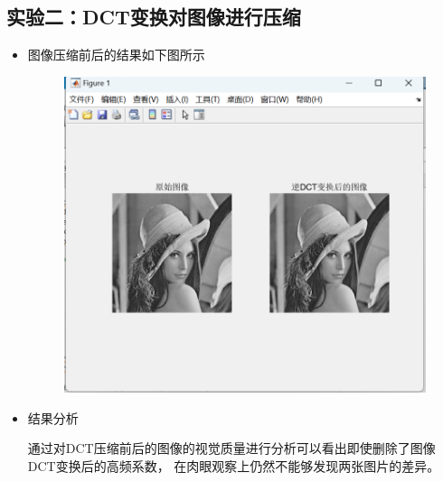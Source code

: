 \documentclass[a4paper,11pt,UTF8]{ctexart}
\newcommand{\bottomcaption}{%
\setlength{\abovecaptionskip}{6pt}%
\setlength{\belowcaptionskip}{6pt}%
\caption}
\newcommand{\xiaowuhao}{\fontsize{9pt}{\baselineskip}\selectfont}   %
\begin{document}
  \subsection{实验二：DCT变换对图像进行压缩}
    \begin{itemize}
      \item 图像压缩前后的结果如下图所示\par
        \begin{figure}[!htbp]
        \centering
        \includegraphics[width=\textwidth]{DCT_change_result.png}
        \bottomcaption{\xiaowuhao{DCT变换前后图像对比}}
        \end{figure}
      \item 结果分析\par
        通过对DCT压缩前后的图像的视觉质量进行分析可以看出即使删除了图像DCT变换后的高频系数，
        在肉眼观察上仍然不能够发现两张图片的差异。
    \end{itemize}
  
\newpage
\end{document}
